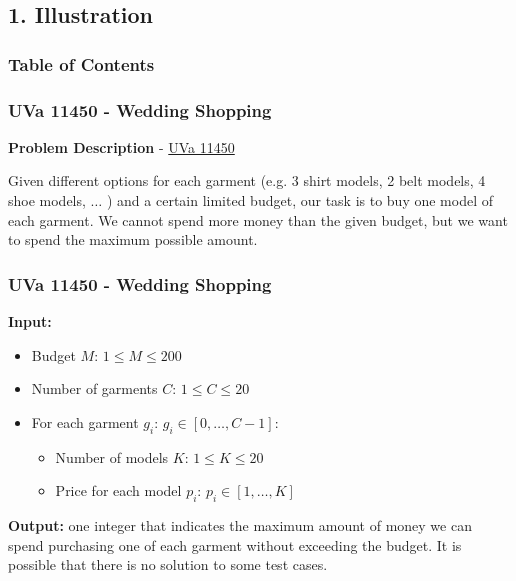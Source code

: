 \documentclass{beamer}
\begin{document}
\subsection{1. Illustration}

\begin{frame}
	\frametitle{Table of Contents}
\end{frame}

\begin{frame}[fragile]
\frametitle{UVa 11450 - Wedding Shopping}

\color{red}\textbf{Problem Description} \color{black} - \href{https://onlinejudge.org/external/114/11450.pdf}{UVa 11450} \\

\vspace{0.2cm}

Given different options for each garment (e.g. 3 shirt models, 2 belt models, 4 shoe models, $\ldots$ ) and a certain limited budget, our task is to buy one model of each garment. We cannot spend more money than the given budget, but we want to spend the maximum possible amount. \\

\end{frame}

\begin{frame}[fragile]
\frametitle{UVa 11450 - Wedding Shopping}

\color{red}\textbf{Input:}\color{black}

\begin{itemize}
    \item Budget $M$: $1\leq M \leq 200$
    \item Number of garments $C$: $1\leq C \leq 20$
    \item For each garment $g_i$: $g_i \in [0,\ldots,C-1]$:
    	\begin{itemize}
		    \item Number of models $K$: $1\leq K \leq 20$
		    \item Price for each model $p_i$: $p_i \in [1,\ldots,K]$
		\end{itemize} 
\end{itemize}

\vspace{0.3cm}

\color{red}\textbf{Output: }\color{black} one integer that indicates the maximum amount of money we can spend purchasing one of each garment without exceeding the budget. It is possible that there is no solution to some test cases.

\end{frame}
\end{document}
